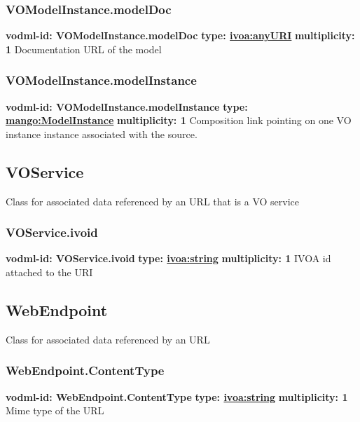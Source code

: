     \subsubsection{VOModelInstance.modelDoc}
      \textbf{vodml-id: VOModelInstance.modelDoc} \newline
      \textbf{type: \hyperref[sect:ivoa]{ivoa:anyURI}} \newline
      \textbf{multiplicity: 1} \newline 
      Documentation URL of the model

    \subsubsection{VOModelInstance.modelInstance}
      \textbf{vodml-id: VOModelInstance.modelInstance} \newline
      \textbf{type: \hyperref[sect:ModelInstance]{mango:ModelInstance}} \newline
      \textbf{multiplicity: 1} \newline 
      Composition link pointing on one VO instance instance associated with the source.

  \subsection{VOService}
  \label{sect:VOService}
    Class for associated data referenced by an URL that is a VO service

    \subsubsection{VOService.ivoid}
      \textbf{vodml-id: VOService.ivoid} \newline
      \textbf{type: \hyperref[sect:ivoa]{ivoa:string}} \newline
      \textbf{multiplicity: 1} \newline 
      IVOA id attached to the URI

  \subsection{WebEndpoint}
  \label{sect:WebEndpoint}
    Class for associated data referenced by an URL

    \subsubsection{WebEndpoint.ContentType}
      \textbf{vodml-id: WebEndpoint.ContentType} \newline
      \textbf{type: \hyperref[sect:ivoa]{ivoa:string}} \newline
      \textbf{multiplicity: 1} \newline 
      Mime type of the URL

